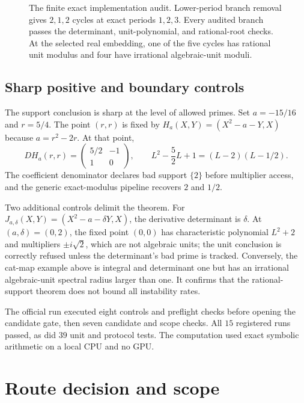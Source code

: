 \documentclass[11pt]{article}
\theoremstyle{definition}
\theoremstyle{remark}
\begin{document}
\begin{figure}[t]
  \centering
  \ExactPeriodAuditFigure
  \caption{The finite exact implementation audit.  Lower-period branch
  removal gives $2,1,2$ cycles at exact periods $1,2,3$.  Every audited branch
  passes the determinant, unit-polynomial, and rational-root checks.  At the
  selected real embedding, one of the five cycles has rational unit modulus
  and four have irrational algebraic-unit moduli.}
  \label{fig:finite-audit}
\end{figure}

\subsection{Sharp positive and boundary controls}

The support conclusion is sharp at the level of allowed primes.  Set
$a=-15/16$ and $r=5/4$.  The point $(r,r)$ is fixed by
$H_a(X,Y)=(X^2-a-Y,X)$ because $a=r^2-2r$.  At that point,
\begin{equation}
 DH_a(r,r)=\begin{pmatrix}5/2&-1\\1&0\end{pmatrix},
 \qquad
 L^2-\frac52L+1=(L-2)(L-1/2).
 \label{eq:sharp-control}
\end{equation}
The coefficient denominator declares bad support $\{2\}$ before multiplier
access, and the generic exact-modulus pipeline recovers $2$ and $1/2$.

Two additional controls delimit the theorem.  For
$J_{a,\delta}(X,Y)=(X^2-a-\delta Y,X)$, the derivative determinant is
$\delta$.  At $(a,\delta)=(0,2)$, the fixed point $(0,0)$ has characteristic
polynomial $L^2+2$ and multipliers $\pm i\sqrt2$, which are not algebraic
units; the unit conclusion is correctly refused unless the determinant's bad
prime is tracked.  Conversely, the cat-map example above is integral and
determinant one but has an irrational algebraic-unit spectral radius larger
than one.  It confirms that the rational-support theorem does not bound all
instability rates.

The official run executed eight controls and preflight checks before opening
the candidate gate, then seven candidate and scope checks.  All $15$ registered
runs passed, as did $39$ unit and protocol tests.  The computation used exact
symbolic arithmetic on a local CPU and no GPU.

\section{Route decision and scope}
\label{sec:scope}
\end{document}

